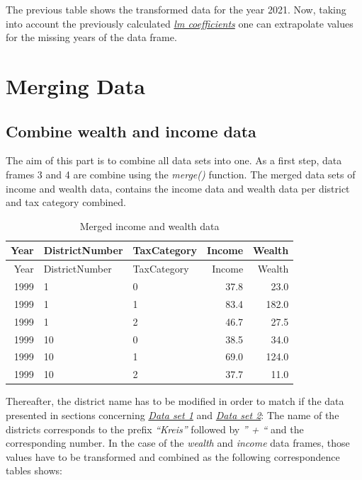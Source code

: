 \documentclass[
]{article}
\begin{document}
The previous table shows the transformed data for the year 2021. Now,
taking into account the previously calculated
\emph{\href{tab:pivot_education1}{lm coefficients}} one can extrapolate
values for the missing years of the data frame.

\pagebreak

\hypertarget{merging-data}{%
\section{Merging Data}\label{merging-data}}

\hypertarget{combine-wealth-and-income-data}{%
\subsection{Combine wealth and income
data}\label{combine-wealth-and-income-data}}

The aim of this part is to combine all data sets into one. As a first
step, data frames 3 and 4 are combine using the \emph{merge()} function.
The merged data sets of income and wealth data, contains the income data
and wealth data per district and tax category combined.

\begin{longtable}[]{@{}rllrr@{}}
\caption{Merged income and wealth data}\tabularnewline
\toprule
Year & DistrictNumber & TaxCategory & Income & Wealth \\
\midrule
\endfirsthead
\toprule
Year & DistrictNumber & TaxCategory & Income & Wealth \\
\midrule
\endhead
1999 & 1 & 0 & 37.8 & 23.0 \\
1999 & 1 & 1 & 83.4 & 182.0 \\
1999 & 1 & 2 & 46.7 & 27.5 \\
1999 & 10 & 0 & 38.5 & 34.0 \\
1999 & 10 & 1 & 69.0 & 124.0 \\
1999 & 10 & 2 & 37.7 & 11.0 \\
\bottomrule
\end{longtable}

Thereafter, the district name has to be modified in order to match if
the data presented in sections concerning
\emph{\protect\hyperlink{Dataux5cux2520setux5cux25201:ux5cux2520Turnoutux5cux2520atux5cux2520theux5cux2520cityux5cux2520andux5cux2520municipalux5cux2520councilux5cux2520electionsux5cux2520sinceux5cux25202006ux2cux5cux2520byux5cux2520cityux5cux2520district.}{Data
set 1}} and
\emph{\protect\hyperlink{Dataux5cux2520setux5cux25202:ux5cux2520Municipalux5cux2520electionsux5cux2520voteux5cux2520shareux2cux5cux2520byux5cux2520partyux5cux2520andux5cux2520electoralux5cux2520districtux5cux2520sinceux5cux25201913.}{Data
set 2}}: The name of the districts corresponds to the prefix
\emph{``Kreis''} followed by \emph{'' + ``} and the corresponding
number. In the case of the \emph{wealth} and \emph{income} data frames,
those values have to be transformed and combined as the following
correspondence tables shows:
\end{document}
